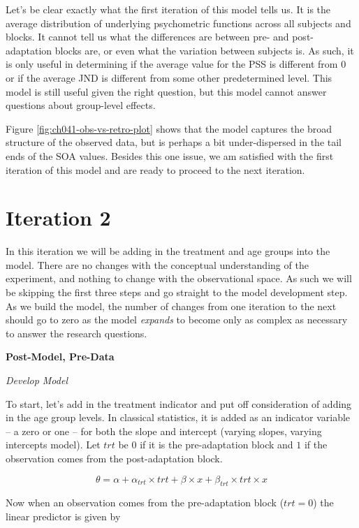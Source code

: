 \documentclass[11pt, oneside, openany]{scrbook}
\begin{document}
Let's be clear exactly what the first iteration of this model tells us. It is the average distribution of underlying psychometric functions across all subjects and blocks. It cannot tell us what the differences are between pre- and post-adaptation blocks are, or even what the variation between subjects is. As such, it is only useful in determining if the average value for the PSS is different from 0 or if the average JND is different from some other predetermined level. This model is still useful given the right question, but this model cannot answer questions about group-level effects.

Figure \ref{fig:ch041-obs-vs-retro-plot} shows that the model captures the broad structure of the observed data, but is perhaps a bit under-dispersed in the tail ends of the SOA values. Besides this one issue, we am satisfied with the first iteration of this model and are ready to proceed to the next iteration.

\hypertarget{iter2}{%
\section{Iteration 2}\label{iter2}}

In this iteration we will be adding in the treatment and age groups into the model. There are no changes with the conceptual understanding of the experiment, and nothing to change with the observational space. As such we will be skipping the first three steps and go straight to the model development step. As we build the model, the number of changes from one iteration to the next should go to zero as the model \emph{expands} to become only as complex as necessary to answer the research questions.

\textbf{Post-Model, Pre-Data}

\emph{Develop Model}

To start, let's add in the treatment indicator and put off consideration of adding in the age group levels. In classical statistics, it is added as an indicator variable -- a zero or one -- for both the slope and intercept (varying slopes, varying intercepts model). Let \(trt\) be \(0\) if it is the pre-adaptation block and \(1\) if the observation comes from the post-adaptation block.

\[
\theta = \alpha + \alpha_{trt} \times trt + \beta \times x + \beta_{trt}\times trt \times x
\]

Now when an observation comes from the pre-adaptation block (\(trt=0\)) the linear predictor is given by
\end{document}
